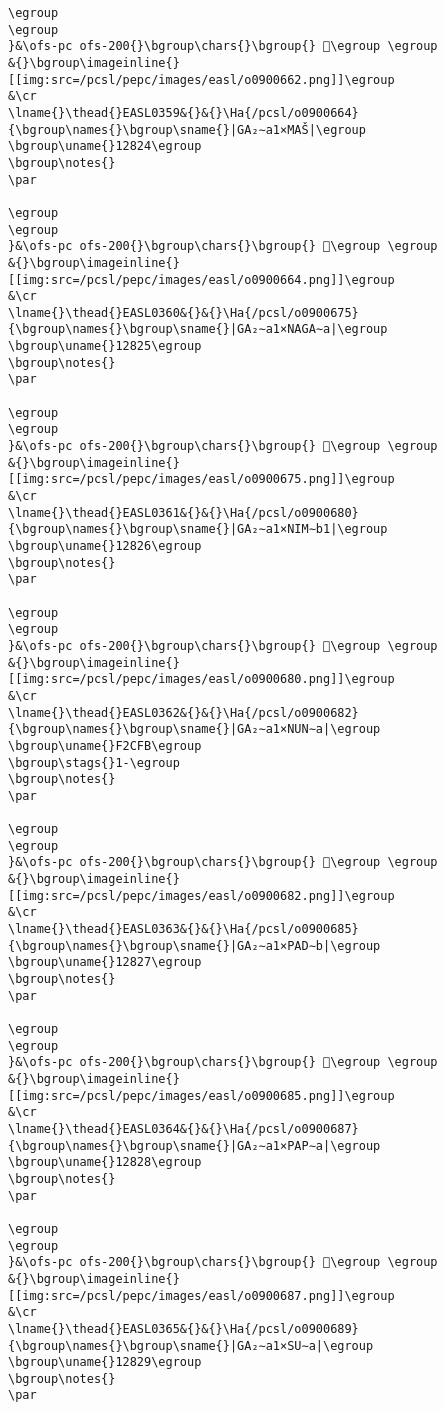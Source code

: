 \begin{verbatim}
\egroup
\egroup
}&\ofs-pc ofs-200{}\bgroup\chars{}\bgroup{} 𒠣\egroup \egroup
&{}\bgroup\imageinline{}[[img:src=/pcsl/pepc/images/easl/o0900662.png]]\egroup
&\cr
\lname{}\thead{}EASL0359&{}&{}\Ha{/pcsl/o0900664}{\bgroup\names{}\bgroup\sname{}|GA₂∼a1×MAŠ|\egroup
\bgroup\uname{}12824\egroup
\bgroup\notes{}
\par 

\egroup
\egroup
}&\ofs-pc ofs-200{}\bgroup\chars{}\bgroup{} 𒠤\egroup \egroup
&{}\bgroup\imageinline{}[[img:src=/pcsl/pepc/images/easl/o0900664.png]]\egroup
&\cr
\lname{}\thead{}EASL0360&{}&{}\Ha{/pcsl/o0900675}{\bgroup\names{}\bgroup\sname{}|GA₂∼a1×NAGA∼a|\egroup
\bgroup\uname{}12825\egroup
\bgroup\notes{}
\par 

\egroup
\egroup
}&\ofs-pc ofs-200{}\bgroup\chars{}\bgroup{} 𒠥\egroup \egroup
&{}\bgroup\imageinline{}[[img:src=/pcsl/pepc/images/easl/o0900675.png]]\egroup
&\cr
\lname{}\thead{}EASL0361&{}&{}\Ha{/pcsl/o0900680}{\bgroup\names{}\bgroup\sname{}|GA₂∼a1×NIM∼b1|\egroup
\bgroup\uname{}12826\egroup
\bgroup\notes{}
\par 

\egroup
\egroup
}&\ofs-pc ofs-200{}\bgroup\chars{}\bgroup{} 𒠦\egroup \egroup
&{}\bgroup\imageinline{}[[img:src=/pcsl/pepc/images/easl/o0900680.png]]\egroup
&\cr
\lname{}\thead{}EASL0362&{}&{}\Ha{/pcsl/o0900682}{\bgroup\names{}\bgroup\sname{}|GA₂∼a1×NUN∼a|\egroup
\bgroup\uname{}F2CFB\egroup
\bgroup\stags{}1-\egroup
\bgroup\notes{}
\par 

\egroup
\egroup
}&\ofs-pc ofs-200{}\bgroup\chars{}\bgroup{} 󲳻\egroup \egroup
&{}\bgroup\imageinline{}[[img:src=/pcsl/pepc/images/easl/o0900682.png]]\egroup
&\cr
\lname{}\thead{}EASL0363&{}&{}\Ha{/pcsl/o0900685}{\bgroup\names{}\bgroup\sname{}|GA₂∼a1×PAD∼b|\egroup
\bgroup\uname{}12827\egroup
\bgroup\notes{}
\par 

\egroup
\egroup
}&\ofs-pc ofs-200{}\bgroup\chars{}\bgroup{} 𒠧\egroup \egroup
&{}\bgroup\imageinline{}[[img:src=/pcsl/pepc/images/easl/o0900685.png]]\egroup
&\cr
\lname{}\thead{}EASL0364&{}&{}\Ha{/pcsl/o0900687}{\bgroup\names{}\bgroup\sname{}|GA₂∼a1×PAP∼a|\egroup
\bgroup\uname{}12828\egroup
\bgroup\notes{}
\par 

\egroup
\egroup
}&\ofs-pc ofs-200{}\bgroup\chars{}\bgroup{} 𒠨\egroup \egroup
&{}\bgroup\imageinline{}[[img:src=/pcsl/pepc/images/easl/o0900687.png]]\egroup
&\cr
\lname{}\thead{}EASL0365&{}&{}\Ha{/pcsl/o0900689}{\bgroup\names{}\bgroup\sname{}|GA₂∼a1×SU∼a|\egroup
\bgroup\uname{}12829\egroup
\bgroup\notes{}
\par 


\end{verbatim}
